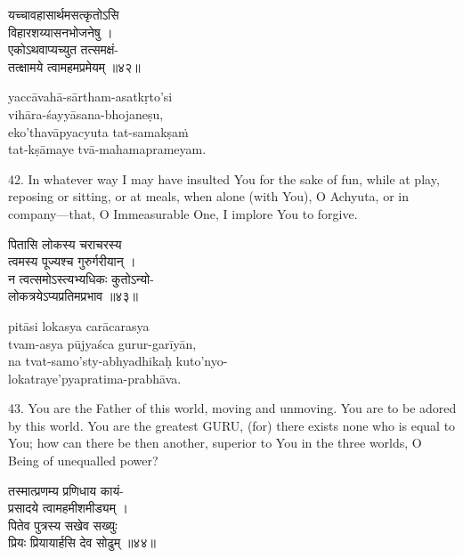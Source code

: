 \begin{gitaverse}
यच्चावहासार्थमसत्कृतोऽसि \\
\tab विहारशय्यासनभोजनेषु । \\
एकोऽथवाप्यच्युत तत्समक्षं- \\
\tab तत्क्षामये त्वामहमप्रमेयम् ॥४२॥
\end{gitaverse}

\begin{transliteration}
yaccāvahā-sārtham-asatkṛto'si \\
\tab vihāra-śayyāsana-bhojaneṣu, \\
eko'thavāpyacyuta tat-samakṣaṁ \\
\tab tat-kṣāmaye tvā-mahamaprameyam.
\end{transliteration}

42. In whatever way I may have insulted You for the sake of fun, while at play,
reposing or sitting, or at meals, when alone (with You), O Achyuta, or in
company---that, O Immeasurable One, I implore You to forgive.

\begin{gitaverse}
पितासि लोकस्य चराचरस्य \\
\tab त्वमस्य पूज्यश्च गुरुर्गरीयान् । \\
न त्वत्समोऽस्त्यभ्यधिकः कुतोऽन्यो- \\
\tab लोकत्रयेऽप्यप्रतिमप्रभाव ॥४३॥
\end{gitaverse}

\begin{transliteration}
pitāsi lokasya carācarasya \\
\tab tvam-asya pūjyaśca gurur-garīyān, \\
na tvat-samo'sty-abhyadhikaḥ kuto'nyo- \\
\tab lokatraye'pyapratima-prabhāva.
\end{transliteration}

43. You are the Father of this world, moving and unmoving. You are to be adored
by this world. You are the greatest GURU, (for) there exists none who is equal
to You; how can there be then another, superior to You in the three worlds, O
Being of unequalled power?

\begin{gitaverse}
तस्मात्प्रणम्य प्रणिधाय कायं- \\
\tab प्रसादये त्वामहमीशमीड्यम् । \\
पितेव पुत्रस्य सखेव सख्युः \\
\tab प्रियः प्रियायार्हसि देव सोढुम् ॥४४॥
\end{gitaverse}

